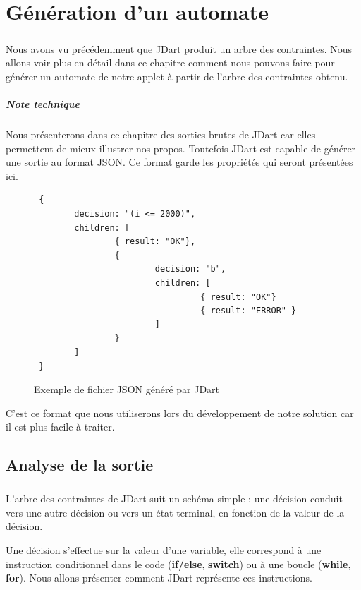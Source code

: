 \chapter{Génération d'un automate}

\paragraph{}
Nous avons vu précédemment que JDart produit un arbre des contraintes. Nous 
allons voir plus en détail dans ce chapitre comment nous pouvons faire pour 
générer un automate de notre applet à partir de l'arbre des contraintes obtenu.

\paragraph{Note technique}
Nous présenterons dans ce chapitre des sorties brutes de JDart car elles
permettent de mieux illustrer nos propos. Toutefois JDart est capable de 
générer une sortie au format JSON. Ce format garde les propriétés qui seront 
présentées ici.

\begin{figure}[H]
 \centering
 \begin{verbatim}
 {
        decision: "(i <= 2000)",
        children: [
                { result: "OK"},
                { 
                        decision: "b",
                        children: [
                                 { result: "OK"}
                                 { result: "ERROR" }
                        ]
                }
        ]
 }
 \end{verbatim}
 \caption{Exemple de fichier JSON généré par JDart}
\end{figure}
C'est ce format que nous utiliserons lors du développement de notre solution 
car il est plus facile à traiter.


\section{Analyse de la sortie}

\paragraph{}
L'arbre des contraintes de JDart suit un schéma simple : une décision conduit 
vers une autre décision ou vers un état terminal, en fonction de la valeur de 
la décision.
\par
Une décision s'effectue sur la valeur d'une variable, elle correspond à une 
instruction conditionnel dans le code (\textbf{if/else}, \textbf{switch}) ou à 
une boucle (\textbf{while}, \textbf{for}). Nous allons présenter comment JDart 
représente ces instructions.

